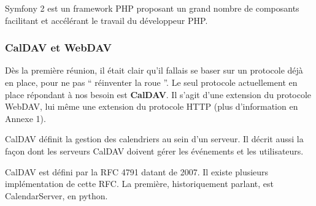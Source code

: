 Symfony 2 est un framework PHP proposant un grand nombre de composants facilitant et accélérant le travail du développeur PHP.

\subsubsection*{CalDAV et WebDAV}

Dès la première réunion, il était clair qu'il fallais se baser sur un protocole déjà en place, pour ne pas `` réinventer la roue ''. Le seul protocole actuellement en place répondant à nos besoin est \textbf{CalDAV}. Il s'agit d'une extension du protocole WebDAV, lui même une extension du protocole HTTP (plus d'information en Annexe 1). 

CalDAV définit la gestion des calendriers au sein d'un serveur. Il décrit aussi la façon dont les serveurs CalDAV doivent gérer les événements et les utilisateurs.

CalDAV est défini par la RFC 4791 datant de 2007. Il existe plusieurs implémentation de cette RFC. La première, historiquement parlant, est CalendarServer, en python.

